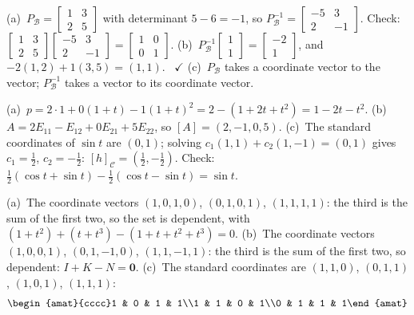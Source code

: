 \documentclass[11pt]{article}
\begin{document}
\begin{description}[leftmargin=0pt,itemsep=5pt]
  \item[Knowledge Check \ref{kc:PB}.] (a)~$P_{\mathcal{B}}=\begin{bmatrix}1&3\\2&5\end{bmatrix}$ with determinant $5-6=-1$, so $P_{\mathcal{B}}^{-1}=\begin{bmatrix}-5&3\\2&-1\end{bmatrix}$. Check: $\begin{bmatrix}1&3\\2&5\end{bmatrix}\begin{bmatrix}-5&3\\2&-1\end{bmatrix}=\begin{bmatrix}1&0\\0&1\end{bmatrix}$. (b)~$P_{\mathcal{B}}^{-1}\begin{bmatrix}1\\1\end{bmatrix}=\begin{bmatrix}-2\\1\end{bmatrix}$, and $-2(1,2)+1(3,5)=(1,1)$. \ $\checkmark$ (c)~$P_{\mathcal{B}}$ takes a coordinate vector to the vector; $P_{\mathcal{B}}^{-1}$ takes a vector to its coordinate vector.
  \item[Knowledge Check \ref{kc:outside}.] (a)~$p=2\cdot1+0(1+t)-1(1+t)^2=2-(1+2t+t^2)=1-2t-t^2$. (b)~$A=2E_{11}-E_{12}+0E_{21}+5E_{22}$, so $[A]=(2,-1,0,5)$. (c)~The standard coordinates of $\sin t$ are $(0,1)$; solving $c_1(1,1)+c_2(1,-1)=(0,1)$ gives $c_1=\tfrac12$, $c_2=-\tfrac12$: $[h]_{\mathcal{C}}=(\tfrac12,-\tfrac12)$. Check: $\tfrac12(\cos t+\sin t)-\tfrac12(\cos t-\sin t)=\sin t$.
  \item[Knowledge Check \ref{kc:testkc}.] (a)~The coordinate vectors $(1,0,1,0)$, $(0,1,0,1)$, $(1,1,1,1)$: the third is the sum of the first two, so the set is dependent, with $(1+t^2)+(t+t^3)-(1+t+t^2+t^3)=0$. (b)~The coordinate vectors $(1,0,0,1)$, $(0,1,-1,0)$, $(1,1,-1,1)$: the third is the sum of the first two, so dependent: $I+K-N=\mathbf{0}$. (c)~The standard coordinates are $(1,1,0)$, $(0,1,1)$, $(1,0,1)$, $(1,1,1)$:
\begin{align*}
\begin{amat}{cccc}1 & 0 & 1 & 1\\1 & 1 & 0 & 1\\0 & 1 & 1 & 1\end{amat}

\end{align*}
\end{description}
\end{document}
